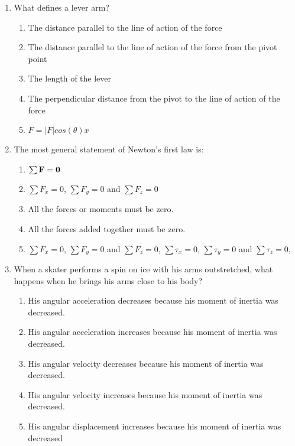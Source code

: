 \documentclass{../../../oss-classkick}
\begin{document}


\genmultidirections

\gengravity

\raggedcolumns
\begin{multicols}{2}
  \begin{enumerate}[leftmargin=18pt]

  \item What defines a lever arm?
    \begin{enumerate}[nosep,leftmargin=18pt,label=(\Alph*)]
    \item The distance parallel to the line of action of the force
    \item The distance parallel to the line of action of the force from the
      pivot point
    \item The length of the lever
    \item The perpendicular distance from the pivot to the line of action of
      the force
    \item $F = |F|cos(\theta)x$
    \end{enumerate}
    \vspace{.7in}
    
  \item The most general statement of Newton's first law is:
    \begin{enumerate}[nosep,leftmargin=18pt,label=(\Alph*)]
    \item $\sum\mathbf{F}=\mathbf{0}$
    \item $\sum F_x=0$, $\sum F_y=0$ and $\sum F_z=0$
    \item All the forces or moments must be zero.
    \item All the forces added together must be zero.
    \item $\sum F_x=0$, $\sum F_y=0$ and $\sum F_z=0$, $\sum\tau_x=0$,
      $\sum\tau_y=0$ and $\sum\tau_z=0$,
    \end{enumerate}
    \vspace{.7in}
    
  \item When a skater performs a spin on ice with his arms outstretched, what
    happens when he brings his arms close to his body?
    \begin{enumerate}[nosep,leftmargin=18pt,label=(\Alph*)]
    \item His angular acceleration decreases because his moment of inertia
      was decreased.
    \item His angular acceleration increases because his moment of inertia
      was decreased.
    \item His angular velocity decreases because his moment of inertia was
      decreased.
    \item His angular velocity increases because his moment of inertia was
      decreased.
    \item His angular displacement increases because his moment of inertia
      was decreased
    \end{enumerate}
    \vspace{.7in}
    

\end{enumerate}
\end{multicols}
\end{document}
